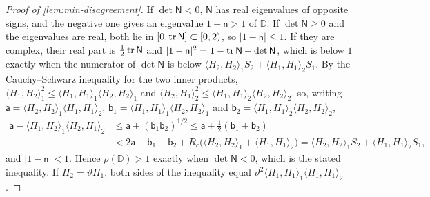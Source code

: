 \begin{proof}[Proof of \cref{lem:min-disagreement}]
If $\det\mathsf N<0$, $\mathsf N$ has real eigenvalues of opposite signs, and the negative one gives an eigenvalue $1-\mathsf n>1$ of $\mathbb D$. If $\det\mathsf N\ge0$ and the eigenvalues are real, both lie in $[0,\operatorname{tr}\mathsf N]\subset[0,2)$, so $\lvert1-\mathsf n\rvert\le1$. If they are complex, their real part is $\frac12\operatorname{tr}\mathsf N$ and $\lvert1-\mathsf n\rvert^2=1-\operatorname{tr}\mathsf N+\det\mathsf N$, which is below $1$ exactly when the numerator of $\det\mathsf N$ is below $\langle H_2,H_2\rangle_1S_2+\langle H_1,H_1\rangle_2S_1$. By the Cauchy--Schwarz inequality for the two inner products, $\langle H_1,H_2\rangle_1^2\le\langle H_1,H_1\rangle_1\langle H_2,H_2\rangle_1$ and $\langle H_2,H_1\rangle_2^2\le\langle H_1,H_1\rangle_2\langle H_2,H_2\rangle_2$, so, writing $\mathsf a=\langle H_2,H_2\rangle_1\langle H_1,H_1\rangle_2$, $\mathsf b_1=\langle H_1,H_1\rangle_1\langle H_2,H_2\rangle_1$ and $\mathsf b_2=\langle H_1,H_1\rangle_2\langle H_2,H_2\rangle_2$,
\begin{align*}
\mathsf a-\langle H_1,H_2\rangle_1\langle H_2,H_1\rangle_2&\le\mathsf a+(\mathsf b_1\mathsf b_2)^{1/2}\le\mathsf a+\tfrac12(\mathsf b_1+\mathsf b_2)\\
&<2\mathsf a+\mathsf b_1+\mathsf b_2+R_c\bigl(\langle H_2,H_2\rangle_1+\langle H_1,H_1\rangle_2\bigr)=\langle H_2,H_2\rangle_1S_2+\langle H_1,H_1\rangle_2S_1,
\end{align*}
and $\lvert1-\mathsf n\rvert<1$. Hence $\rho(\mathbb D)>1$ exactly when $\det\mathsf N<0$, which is the stated inequality. If $H_2=\vartheta H_1$, both sides of the inequality equal $\vartheta^2\langle H_1,H_1\rangle_1\langle H_1,H_1\rangle_2$.
\end{proof}

